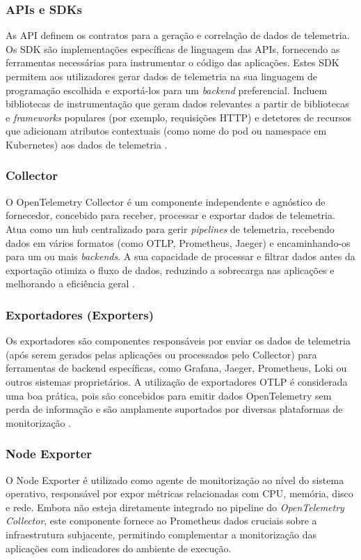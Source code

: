 \subsubsection{APIs e SDKs}
As API definem os contratos para a geração e correlação de dados de telemetria. Os SDK são implementações específicas de linguagem das APIs, fornecendo as ferramentas necessárias para instrumentar o código das aplicações. Estes SDK permitem aos utilizadores gerar dados de telemetria na sua linguagem de programação escolhida e exportá-los para um \textit{backend} preferencial. Incluem bibliotecas de instrumentação que geram dados relevantes a partir de bibliotecas e \textit{frameworks} populares (por exemplo, requisições HTTP) e detetores de recursos que adicionam atributos contextuais (como nome do pod ou namespace em Kubernetes) aos dados de telemetria \cite{opentelemetry_docs,Thakur2022}.

\subsubsection{Collector}
O OpenTelemetry Collector é um componente independente e agnóstico de fornecedor, concebido para receber, processar e exportar dados de telemetria. Atua como um hub centralizado para gerir \textit{pipelines} de telemetria, recebendo dados em vários formatos (como OTLP, Prometheus, Jaeger) e encaminhando-os para um ou mais \textit{backends}. A sua capacidade de processar e filtrar dados antes da exportação otimiza o fluxo de dados, reduzindo a sobrecarga nas aplicações e melhorando a eficiência geral \cite{opentelemetry_docs,Thakur2022}.

\subsubsection{Exportadores (Exporters)}
Os exportadores são componentes responsáveis por enviar os dados de telemetria (após serem gerados pelas aplicações ou processados pelo Collector) para ferramentas de backend específicas, como Grafana, Jaeger, Prometheus, Loki ou outros sistemas proprietários. A utilização de exportadores OTLP é considerada uma boa prática, pois são concebidos para emitir dados OpenTelemetry sem perda de informação e são amplamente suportados por diversas plataformas de monitorização \cite{opentelemetry_docs,Thakur2022}.

\subsubsection{Node Exporter}
O Node Exporter é utilizado como agente de monitorização ao nível do sistema operativo, responsável por expor métricas relacionadas com CPU, memória, disco e rede. Embora não esteja diretamente integrado no pipeline do \textit{OpenTelemetry Collector}, este componente fornece ao Prometheus dados cruciais sobre a infraestrutura subjacente, permitindo complementar a monitorização das aplicações com indicadores do ambiente de execução.

